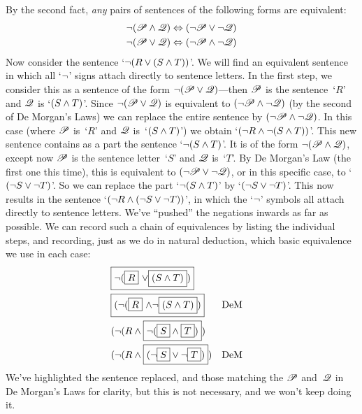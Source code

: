 By the second fact, \emph{any} pairs of sentences of the following forms are equivalent:
\begin{align*}
	\neg (\mathscr{P} \wedge \mathscr{Q}) & \Leftrightarrow (\neg \mathscr{P} \vee \neg \mathscr{Q})\\
	\neg (\mathscr{P} \vee \mathscr{Q}) & \Leftrightarrow (\neg \mathscr{P} \wedge \neg \mathscr{Q})
\end{align*}
Now consider the sentence `$\neg(R \vee (S \wedge T))$'. We will find an equivalent sentence in which all `$\neg$' signs attach directly to sentence letters. In the first step, we consider this as a sentence of the form $\neg(\mathscr{P} \vee \mathscr{Q})$---then $\mathscr{P}$ is the sentence~`$R$' and $\mathscr{Q}$ is `$(S \wedge T)$'. Since $\neg(\mathscr{P} \vee \mathscr{Q})$ is equivalent to $(\neg \mathscr{P} \wedge \neg \mathscr{Q})$ (by the second of De Morgan's Laws) we can replace the entire sentence by $(\neg \mathscr{P} \wedge \neg \mathscr{Q})$. In this case (where $\mathscr{P}$ is~`$R$' and $\mathscr{Q}$ is~`$(S \wedge T)$') we obtain `$(\neg R \wedge \neg (S \wedge T))$'. This new sentence contains as a part the sentence `$\neg (S \wedge T)$'. It is of the form $\neg(\mathscr{P} \wedge \mathscr{Q})$, except now $\mathscr{P}$ is the sentence letter~`$S$' and $\mathscr{Q}$ is~`$T$'. By De Morgan's Law (the first one this time), this is equivalent to $(\neg\mathscr{P} \vee \neg\mathscr{Q})$, or in this specific case, to `$(\neg S \vee \neg T)$'. So we can replace the part `$\neg (S \wedge T)$' by `$(\neg S \vee \neg T)$'. This now results in the sentence `$(\neg R \wedge (\neg S \vee \neg T))$', in which the `$\neg$' symbols all attach directly to sentence letters. We've ``pushed'' the negations inwards as far as possible.  We can record such a chain of equivalences by listing the individual steps, and recording, just as we do in natural deduction, which basic equivalence we use in each case:
\begin{align*}
	& \fbox{\ensuremath{\neg}(\fbox{$R$} \ensuremath{\vee}\fbox{$(S \wedge T)$})} \\
	& \fbox{(\ensuremath{\neg}(\fbox{$R$} \ensuremath{\wedge}\ensuremath{\neg}\fbox{$(S \wedge T)$})} && \text{DeM}\\
	& (\neg(R \wedge \fbox{$\neg(\fbox{$S$} \wedge \fbox{$T$})$}) \\
	& (\neg(R \wedge \fbox{$(\neg \fbox{$S$} \vee \neg \fbox{$T$})$}) && \text{DeM}
\end{align*}
We've highlighted the sentence replaced, and those matching the $\mathscr{P}$ and~$\mathscr{Q}$ in De Morgan's Laws for clarity, but this is not necessary, and we won't keep doing it.

